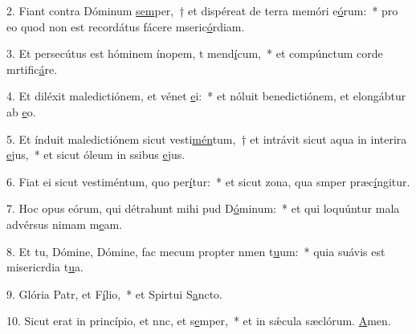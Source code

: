 2. Fiant contra Dóminum \uline{sem}per,~† et dispéreat de terra memóri e\uline{ó}rum:~* pro eo quod non est recordátus fácere mseric\uline{ó}rdiam.\par 
3. Et persecútus est hóminem ínopem, t mend\uline{í}cum,~* et compúnctum corde mrtific\uline{á}re.\par 
4. Et diléxit maledictiónem, et vénet \uline{e}i:~* et nóluit benedictiónem, et elongábtur ab \uline{e}o.\par 
5. Et índuit maledictiónem sicut vesti\uline{mén}tum,~† et intrávit sicut aqua in interira \uline{e}jus,~* et sicut óleum in ssibus \uline{e}jus.\par 
6. Fiat ei sicut vestiméntum, quo per\uline{í}tur:~* et sicut zona, qua smper præc\uline{í}ngitur.\par 
7. Hoc opus eórum, qui détrahunt mihi pud D\uline{ó}minum:~* et qui loquúntur mala advérsus nimam m\uline{e}am.\par 
8. Et tu, Dómine, Dómine, fac mecum propter nmen t\uline{u}um:~* quia suávis est misericrdia t\uline{u}a.\par 
9. Glória Patr, et F\uline{í}lio,~* et Spirtui S\uline{a}ncto.\par 
10. Sicut erat in princípio, et nnc, et s\uline{e}mper,~* et in sǽcula sæclórum. \uline{A}men.\par 
